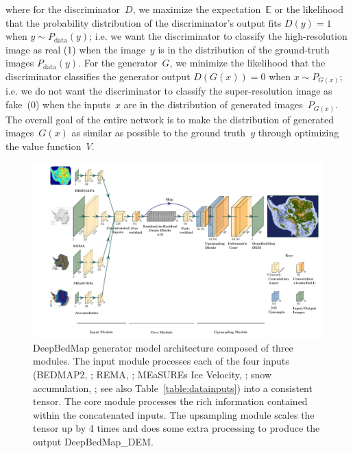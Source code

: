 \documentclass[tc, noline]{copernicus}
\begin{document}
where for the discriminator~$D$, we maximize the expectation~$\mathbb{E}$ or the likelihood that the probability distribution of the discriminator's output fits $D(y)=1$ when $y \sim P_{\text{data}}(y)$; i.e. we want the discriminator to classify the high-resolution image as real (1) when the image~$y$ is in the distribution of the ground-truth images $P_{\text{data}}(y)$.
For the generator~$G$, we minimize the likelihood that the discriminator classifies the generator output $D(G(x))=0$ when $x \sim P_{G(x)}$; i.e. we do not want the discriminator to classify the super-resolution image as fake~(0) when the inputs~$x$ are in the distribution of generated images~$P_{G(x)}$.
The overall goal of the entire network is to make the distribution of generated images~$G(x)$ as similar as possible to the ground truth~$y$ through optimizing the value function~$V$.

\begin{figure}[t]
  \includegraphics[width=170mm]{figures/fig1_deepbedmap_architecture_compressed.pdf}
  \caption{
    DeepBedMap generator model architecture composed of three modules.
    The input module processes each of the four inputs (BEDMAP2, \citealp{FretwellBedmap2improvedice2013}; REMA, \citealp{HowatReferenceElevationModel2019}; MEaSUREs Ice Velocity, \citealp{MouginotMEaSUREsPhaseMap2019}; snow accumulation, \citealp{ArthernAntarcticsnowaccumulation2006}; see also Table~\ref{table:datainputs}) into a consistent tensor.
    The core module processes the rich information contained within the concatenated inputs.
    The upsampling module scales the tensor up by 4 times and does some extra processing to produce the output DeepBedMap\_DEM.
  }
  \label{fig:1}
\end{figure}
\end{document}
